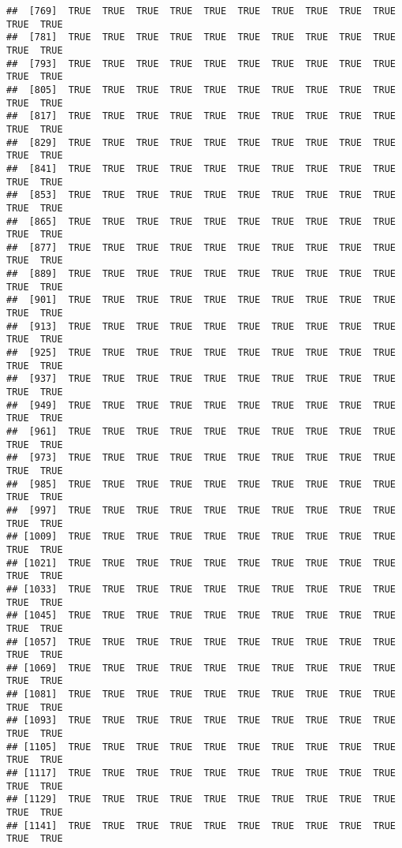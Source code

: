 \documentclass[
]{article}
\begin{document}
\begin{verbatim}
##  [769]  TRUE  TRUE  TRUE  TRUE  TRUE  TRUE  TRUE  TRUE  TRUE  TRUE  TRUE  TRUE
##  [781]  TRUE  TRUE  TRUE  TRUE  TRUE  TRUE  TRUE  TRUE  TRUE  TRUE  TRUE  TRUE
##  [793]  TRUE  TRUE  TRUE  TRUE  TRUE  TRUE  TRUE  TRUE  TRUE  TRUE  TRUE  TRUE
##  [805]  TRUE  TRUE  TRUE  TRUE  TRUE  TRUE  TRUE  TRUE  TRUE  TRUE  TRUE  TRUE
##  [817]  TRUE  TRUE  TRUE  TRUE  TRUE  TRUE  TRUE  TRUE  TRUE  TRUE  TRUE  TRUE
##  [829]  TRUE  TRUE  TRUE  TRUE  TRUE  TRUE  TRUE  TRUE  TRUE  TRUE  TRUE  TRUE
##  [841]  TRUE  TRUE  TRUE  TRUE  TRUE  TRUE  TRUE  TRUE  TRUE  TRUE  TRUE  TRUE
##  [853]  TRUE  TRUE  TRUE  TRUE  TRUE  TRUE  TRUE  TRUE  TRUE  TRUE  TRUE  TRUE
##  [865]  TRUE  TRUE  TRUE  TRUE  TRUE  TRUE  TRUE  TRUE  TRUE  TRUE  TRUE  TRUE
##  [877]  TRUE  TRUE  TRUE  TRUE  TRUE  TRUE  TRUE  TRUE  TRUE  TRUE  TRUE  TRUE
##  [889]  TRUE  TRUE  TRUE  TRUE  TRUE  TRUE  TRUE  TRUE  TRUE  TRUE  TRUE  TRUE
##  [901]  TRUE  TRUE  TRUE  TRUE  TRUE  TRUE  TRUE  TRUE  TRUE  TRUE  TRUE  TRUE
##  [913]  TRUE  TRUE  TRUE  TRUE  TRUE  TRUE  TRUE  TRUE  TRUE  TRUE  TRUE  TRUE
##  [925]  TRUE  TRUE  TRUE  TRUE  TRUE  TRUE  TRUE  TRUE  TRUE  TRUE  TRUE  TRUE
##  [937]  TRUE  TRUE  TRUE  TRUE  TRUE  TRUE  TRUE  TRUE  TRUE  TRUE  TRUE  TRUE
##  [949]  TRUE  TRUE  TRUE  TRUE  TRUE  TRUE  TRUE  TRUE  TRUE  TRUE  TRUE  TRUE
##  [961]  TRUE  TRUE  TRUE  TRUE  TRUE  TRUE  TRUE  TRUE  TRUE  TRUE  TRUE  TRUE
##  [973]  TRUE  TRUE  TRUE  TRUE  TRUE  TRUE  TRUE  TRUE  TRUE  TRUE  TRUE  TRUE
##  [985]  TRUE  TRUE  TRUE  TRUE  TRUE  TRUE  TRUE  TRUE  TRUE  TRUE  TRUE  TRUE
##  [997]  TRUE  TRUE  TRUE  TRUE  TRUE  TRUE  TRUE  TRUE  TRUE  TRUE  TRUE  TRUE
## [1009]  TRUE  TRUE  TRUE  TRUE  TRUE  TRUE  TRUE  TRUE  TRUE  TRUE  TRUE  TRUE
## [1021]  TRUE  TRUE  TRUE  TRUE  TRUE  TRUE  TRUE  TRUE  TRUE  TRUE  TRUE  TRUE
## [1033]  TRUE  TRUE  TRUE  TRUE  TRUE  TRUE  TRUE  TRUE  TRUE  TRUE  TRUE  TRUE
## [1045]  TRUE  TRUE  TRUE  TRUE  TRUE  TRUE  TRUE  TRUE  TRUE  TRUE  TRUE  TRUE
## [1057]  TRUE  TRUE  TRUE  TRUE  TRUE  TRUE  TRUE  TRUE  TRUE  TRUE  TRUE  TRUE
## [1069]  TRUE  TRUE  TRUE  TRUE  TRUE  TRUE  TRUE  TRUE  TRUE  TRUE  TRUE  TRUE
## [1081]  TRUE  TRUE  TRUE  TRUE  TRUE  TRUE  TRUE  TRUE  TRUE  TRUE  TRUE  TRUE
## [1093]  TRUE  TRUE  TRUE  TRUE  TRUE  TRUE  TRUE  TRUE  TRUE  TRUE  TRUE  TRUE
## [1105]  TRUE  TRUE  TRUE  TRUE  TRUE  TRUE  TRUE  TRUE  TRUE  TRUE  TRUE  TRUE
## [1117]  TRUE  TRUE  TRUE  TRUE  TRUE  TRUE  TRUE  TRUE  TRUE  TRUE  TRUE  TRUE
## [1129]  TRUE  TRUE  TRUE  TRUE  TRUE  TRUE  TRUE  TRUE  TRUE  TRUE  TRUE  TRUE
## [1141]  TRUE  TRUE  TRUE  TRUE  TRUE  TRUE  TRUE  TRUE  TRUE  TRUE  TRUE  TRUE

\end{verbatim}
\end{document}
